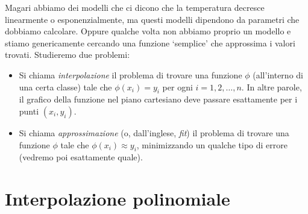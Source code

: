 \documentclass[a4paper]{report}
\theoremstyle{definiton}
\theoremstyle{remark}
\newcommand{\x}{\mathbf{x}}
\begin{document}
Magari abbiamo dei modelli che ci dicono che la temperatura decresce linearmente o esponenzialmente, ma questi modelli dipendono da parametri che dobbiamo calcolare. Oppure qualche volta non abbiamo proprio un modello e stiamo genericamente cercando una funzione `semplice' che approssima i valori trovati. Studieremo due problemi:
\begin{itemize}
    \item Si chiama \emph{interpolazione} il problema di trovare una funzione $\phi$ (all'interno di una certa classe) tale che $\phi(x_i) = y_i$ per ogni $i=1,2,\dots, n$. In altre parole, il grafico della funzione nel piano cartesiano deve passare esattamente per i punti $(x_i, y_i)$.
    \item Si chiama \emph{approssimazione} (o, dall'inglese, \emph{fit}) il problema di trovare una funzione $\phi$ tale che $\phi(x_i) \approx y_i$, minimizzando un qualche tipo di errore (vedremo poi esattamente quale).
\end{itemize}

\begin{center}
\end{center}


\section{Interpolazione polinomiale}
\end{document}
